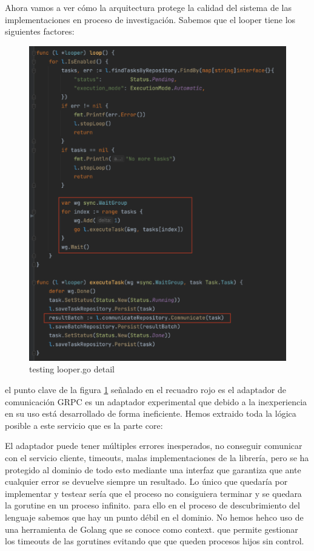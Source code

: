 Ahora vamos a ver cómo la arquitectura protege la calidad del sistema de las implementaciones en proceso de investigación. Sabemos que el looper tiene los siguientes factores:

\begin{figure}[H]
    \centering
    \includegraphics[height=0.3\textheight]{./part/Ejecucion/Seguimiento/Testing/img/Looper}
    \caption{testing looper.go detail}\label{fig:testingLooper}
\end{figure}

el punto clave de la figura \ref{fig:testingLooper} señalado en el recuadro rojo es el adaptador de comunicación GRPC es un adaptador experimental que debido a la inexperiencia en su uso está desarrollado de forma ineficiente. Hemos extraido toda la lógica posible a este servicio que es la parte core:

El adaptador puede tener múltiples errores inesperados, no conseguir comunicar con el servicio cliente, timeouts, malas implementaciones de la librería, pero se ha protegido al dominio de todo esto mediante una interfaz que garantiza que ante cualquier error se devuelve siempre un resultado. Lo único que quedaría por implementar y testear sería que el proceso no consiguiera terminar y se quedara la gorutine en un proceso infinito. para ello en el proceso de descubrimiento del lenguaje sabemos que hay un punto débil en el dominio. No hemos hehco uso de una herramienta de Golang que se conoce como context. que permite gestionar los timeouts de las gorutines evitando que que queden procesos hijos sin control.

